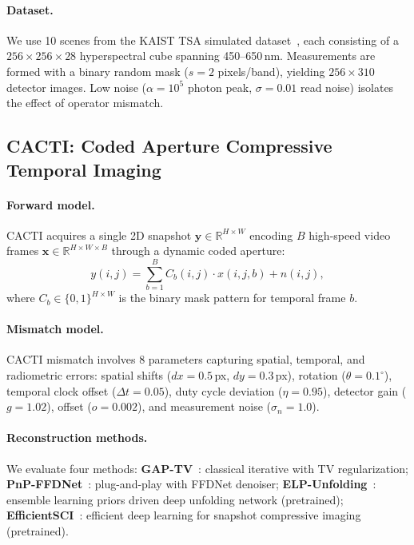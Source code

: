 \documentclass[runningheads]{llncs}
\begin{document}
\paragraph{Dataset.}
We use 10 scenes from the KAIST TSA simulated dataset~\cite{choi2017kaist}, each consisting of a $256 \times 256 \times 28$ hyperspectral cube spanning 450--650\,nm.
Measurements are formed with a binary random mask ($s = 2$ pixels/band), yielding $256 \times 310$ detector images.
Low noise ($\alpha = 10^5$ photon peak, $\sigma = 0.01$ read noise) isolates the effect of operator mismatch.

\subsection{CACTI: Coded Aperture Compressive Temporal Imaging}
\label{sec:cacti}

\paragraph{Forward model.}
CACTI acquires a single 2D snapshot $\mathbf{y} \in \mathbb{R}^{H \times W}$ encoding $B$ high-speed video frames $\mathbf{x} \in \mathbb{R}^{H \times W \times B}$ through a dynamic coded aperture:
\begin{equation}
    y(i, j) = \sum_{b=1}^{B} C_b(i, j) \cdot x(i, j, b) + n(i, j),
    \label{eq:cacti_forward}
\end{equation}
where $C_b \in \{0,1\}^{H \times W}$ is the binary mask pattern for temporal frame $b$.

\paragraph{Mismatch model.}
CACTI mismatch involves 8 parameters capturing spatial, temporal, and radiometric errors:
spatial shifts ($dx = 0.5$\,px, $dy = 0.3$\,px), rotation ($\theta = 0.1^\circ$), temporal clock offset ($\Delta t = 0.05$), duty cycle deviation ($\eta = 0.95$), detector gain ($g = 1.02$), offset ($o = 0.002$), and measurement noise ($\sigma_n = 1.0$).

\paragraph{Reconstruction methods.}
We evaluate four methods:
\textbf{GAP-TV}~\cite{yuan2016gaptv}: classical iterative with TV regularization;
\textbf{PnP-FFDNet}~\cite{yuan2020pnp}: plug-and-play with FFDNet denoiser;
\textbf{ELP-Unfolding}~\cite{yang2022elp}: ensemble learning priors driven deep unfolding network (pretrained);
\textbf{EfficientSCI}~\cite{wang2023efficientsci}: efficient deep learning for snapshot compressive imaging (pretrained).
\end{document}
